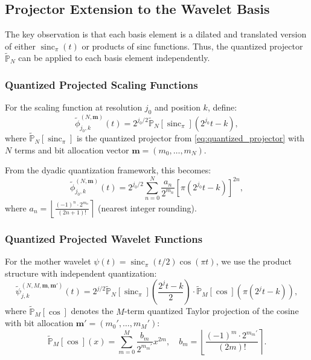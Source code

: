 \subsection{Projector Extension to the Wavelet Basis}

The key observation is that each basis element is a dilated and translated version of either $\operatorname{sinc}_\pi(t)$ or products of sinc functions. Thus, the quantized projector $\widetilde{\mathbb{P}}_N$ can be applied to each basis element independently.

\subsubsection{Quantized Projected Scaling Functions}

For the scaling function at resolution $j_0$ and position $k$, define:
\begin{equation}
\widetilde{\phi}_{j_0,k}^{(N,\mathbf{m})}(t) = 2^{j_0/2} \widetilde{\mathbb{P}}_N[\operatorname{sinc}_\pi]\left(2^{j_0}t - k\right),
\label{eq:proj_scaling}
\end{equation}
where $\widetilde{\mathbb{P}}_N[\operatorname{sinc}_\pi]$ is the quantized projector from \eqref{eq:quantized_projector} with $N$ terms and bit allocation vector $\mathbf{m} = (m_0, \ldots, m_N)$.

From the dyadic quantization framework, this becomes:
\begin{equation}
\widetilde{\phi}_{j_0,k}^{(N,\mathbf{m})}(t) = 2^{j_0/2} \sum_{n=0}^{N} \frac{a_n}{2^{m_n}} \left[\pi(2^{j_0}t - k)\right]^{2n},
\label{eq:proj_scaling_explicit}
\end{equation}
where $a_n = \left\lfloor \frac{(-1)^n \cdot 2^{m_n}}{(2n+1)!} \right\rceil$ (nearest integer rounding).

\subsubsection{Quantized Projected Wavelet Functions}

For the mother wavelet $\psi(t) = \operatorname{sinc}_\pi(t/2)\cos(\pi t)$, we use the product structure with independent quantization:
\begin{equation}
\widetilde{\psi}_{j,k}^{(N,M,\mathbf{m},\mathbf{m}')}(t) = 2^{j/2} \widetilde{\mathbb{P}}_N[\operatorname{sinc}_\pi]\left(\frac{2^j t - k}{2}\right) \cdot \widetilde{\mathbb{P}}_M[\cos]\left(\pi(2^j t - k)\right),
\label{eq:proj_wavelet}
\end{equation}
where $\widetilde{\mathbb{P}}_M[\cos]$ denotes the $M$-term quantized Taylor projection of the cosine with bit allocation $\mathbf{m}' = (m_0', \ldots, m_M')$:
\begin{equation}
\widetilde{\mathbb{P}}_M[\cos](x) = \sum_{m=0}^{M} \frac{b_m}{2^{m_m'}} x^{2m}, \quad b_m = \left\lfloor \frac{(-1)^m \cdot 2^{m_m'}}{(2m)!} \right\rceil.
\label{eq:cos_proj}
\end{equation}

